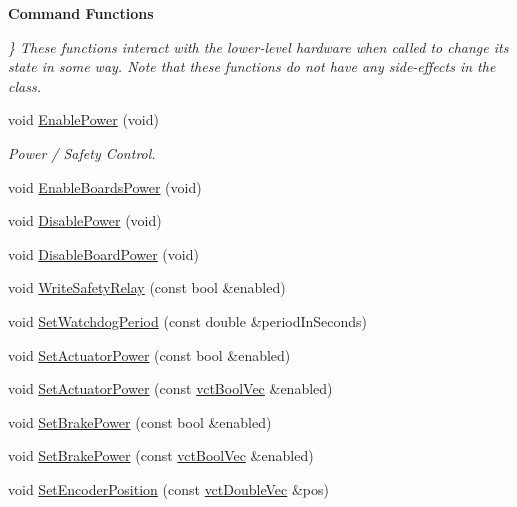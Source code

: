 \begin{Indent}{\bf Command Functions}\par
{\em \} These functions interact with the lower-\/level hardware when called to change its state in some way. Note that these functions do not have any side-\/effects in the class. }\begin{DoxyCompactItemize}
\item 
void \hyperlink{classsaw_robot_i_o1394_1_1osa_robot1394_a89f0d7f2ed2aa3d5e8398da89276b108}{Enable\-Power} (void)
\begin{DoxyCompactList}\small\item\em Power / Safety Control. \end{DoxyCompactList}\item 
void \hyperlink{classsaw_robot_i_o1394_1_1osa_robot1394_ac31ce6b6da5276bae89eebce4e9a186b}{Enable\-Boards\-Power} (void)
\item 
void \hyperlink{classsaw_robot_i_o1394_1_1osa_robot1394_a359d28a205ddf92f7b51140ac3fbbf30}{Disable\-Power} (void)
\item 
void \hyperlink{classsaw_robot_i_o1394_1_1osa_robot1394_ac3166a4f77a336b7d62bd3a4714b6f19}{Disable\-Board\-Power} (void)
\item 
void \hyperlink{classsaw_robot_i_o1394_1_1osa_robot1394_a8a4e0e38e3bf9f399d2c96c46672d21d}{Write\-Safety\-Relay} (const bool \&enabled)
\item 
void \hyperlink{classsaw_robot_i_o1394_1_1osa_robot1394_a6635e06d2704dd3b19c8527de6a00f29}{Set\-Watchdog\-Period} (const double \&period\-In\-Seconds)
\item 
void \hyperlink{classsaw_robot_i_o1394_1_1osa_robot1394_ac663115c6f8371a09a58829815b3bcfc}{Set\-Actuator\-Power} (const bool \&enabled)
\item 
void \hyperlink{classsaw_robot_i_o1394_1_1osa_robot1394_a9c4d9418f9f94029a424793754aec522}{Set\-Actuator\-Power} (const \hyperlink{vct_dynamic_vector_types_8h_aeb2237c134aee3769198bd9d55c8a9e0}{vct\-Bool\-Vec} \&enabled)
\item 
void \hyperlink{classsaw_robot_i_o1394_1_1osa_robot1394_aba8de9371f9f46984f92970a30c2fd8e}{Set\-Brake\-Power} (const bool \&enabled)
\item 
void \hyperlink{classsaw_robot_i_o1394_1_1osa_robot1394_a7b6d3652c1b1933d64d3ffd6cf143db2}{Set\-Brake\-Power} (const \hyperlink{vct_dynamic_vector_types_8h_aeb2237c134aee3769198bd9d55c8a9e0}{vct\-Bool\-Vec} \&enabled)
\item 
void \hyperlink{classsaw_robot_i_o1394_1_1osa_robot1394_a85fab2fddef54480e415cf09ec9cb2ff}{Set\-Encoder\-Position} (const \hyperlink{vct_dynamic_vector_types_8h_ade4b3068c86fb88f41af2e5187e491c2}{vct\-Double\-Vec} \&pos)

\end{DoxyCompactItemize}
\end{Indent}
